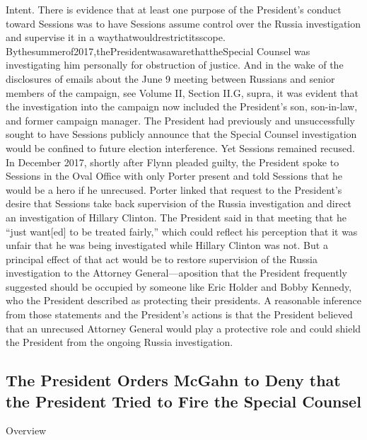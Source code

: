 Intent. There is evidence that at least one purpose of the President's conduct toward Sessions was to have Sessions assume control over the Russia investigation and supervise it in a waythatwouldrestrictitsscope. Bythesummerof2017,thePresidentwasawarethattheSpecial Counsel was investigating him personally for obstruction of justice. And in the wake of the disclosures of emails about the June 9 meeting between Russians and senior members of the campaign, see Volume II, Section II.G, supra, it was evident that the investigation into the campaign now included the President's son, son-in-law, and former campaign manager. The President had previously and unsuccessfully sought to have Sessions publicly announce that the Special Counsel investigation would be confined to future election interference. Yet Sessions remained recused. In December 2017, shortly after Flynn pleaded guilty, the President spoke to Sessions in the Oval Office with only Porter present and told Sessions that he would be a hero if he unrecused. Porter linked that request to the President's desire that Sessions take back supervision of the Russia investigation and direct an investigation of Hillary Clinton. The President said in that meeting that he “just want[ed] to be treated fairly,” which could reflect his perception that it was unfair that he was being investigated while Hillary Clinton was not. But a principal effect of that act would be to restore supervision of the Russia investigation to the
Attorney General—aposition that the President frequently suggested should be occupied by someone like Eric Holder and Bobby Kennedy, who the President described as protecting their presidents. A reasonable inference from those statements and the President's actions is that the President believed that an unrecused Attorney General would play a protective role and could shield the President from the ongoing Russia investigation.

\subsection{The President Orders McGahn to Deny that the President Tried to Fire the Special Counsel}

Overview

